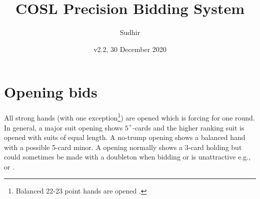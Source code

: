 \documentclass[a4paper,article,oneside]{memoir}
\begin{document}
\title{COSL Precision Bidding System}
\author{Sudhir}
\date{v2.2, 30 December 2020}
\maketitle

\tableofcontents

\pagebreak

\section{Opening bids}

All strong hands (with one exception\footnote{Balanced 22-23
  point hands are opened .}) are opened  which is forcing
for one round. In general, a major suit opening shows $5^+$-cards and
the higher ranking suit is opened with suits of equal length. A
no-trump opening shows a balanced hand with a possible 5-card minor. A
 opening normally shows a 3-card holding but could sometimes be
made with a doubleton when bidding  or  is unattractive
e.g.,  or .
\end{document}
